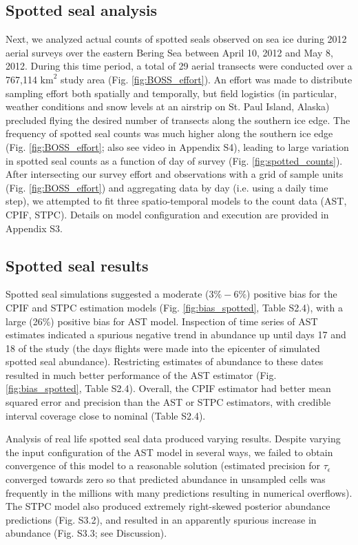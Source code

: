 \documentclass[12pt,english]{article}
\begin{document}
\begin{spacing}{1.9}
\subsection{Spotted seal analysis}

Next, we analyzed actual counts of spotted seals observed on sea ice during 2012 aerial surveys over the eastern Bering Sea between April 10, 2012 and May 8, 2012.  During this time period, a total of 29 aerial transects were conducted over a 767,114 $\text{km}^2$ study area (Fig. \ref{fig:BOSS_effort}).  An effort was made to distribute sampling effort both spatially and temporally, but field logistics (in particular, weather conditions and snow levels at an airstrip on St. Paul Island, Alaska) precluded flying the desired number of transects along the southern ice edge.  The frequency of spotted seal counts was much higher along the southern ice edge (Fig. \ref{fig:BOSS_effort}; also see video in Appendix S4), leading to large variation in spotted seal counts as a function of day of survey (Fig. \ref{fig:spotted_counts}).  After intersecting our survey effort and observations with a grid of sample units (Fig. \ref{fig:BOSS_effort}) and aggregating data by day (i.e. using a daily time step), we attempted to fit three spatio-temporal models to the count data (AST, CPIF, STPC).  Details on model configuration and execution are provided in Appendix S3.

\subsection{Spotted seal results}

Spotted seal simulations suggested a moderate ($3\%-6\%$) positive bias for the CPIF and STPC estimation models (Fig. \ref{fig:bias_spotted}, Table S2.4), with a large (26\%) positive bias for AST model.  Inspection of time series of AST estimates indicated a spurious negative trend in abundance up until days 17 and 18 of the study (the days flights were made into the epicenter of simulated spotted seal abundance).  Restricting estimates of abundance to these dates resulted in much better performance of the AST estimator (Fig. \ref{fig:bias_spotted}, Table S2.4).  Overall, the CPIF estimator had better mean squared error and precision than the AST or STPC estimators, with credible interval coverage close to nominal (Table S2.4).

Analysis of real life spotted seal data produced varying results.  Despite varying the input configuration of the AST model in several ways, we failed to obtain convergence of this model to a reasonable solution (estimated precision for $\tau_\epsilon$ converged towards zero so that predicted abundance in unsampled cells was frequently in the millions with many predictions resulting in numerical overflows). The STPC model also produced extremely right-skewed posterior abundance predictions (Fig. S3.2), and resulted in an apparently spurious increase in abundance (Fig. S3.3; see Discussion).


\end{spacing}
\end{document}
